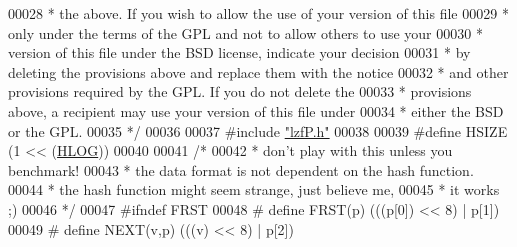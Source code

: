 \begin{DoxyCode}
00028 \textcolor{comment}{ * the above. If you wish to allow the use of your version of this file}
00029 \textcolor{comment}{ * only under the terms of the GPL and not to allow others to use your}
00030 \textcolor{comment}{ * version of this file under the BSD license, indicate your decision}
00031 \textcolor{comment}{ * by deleting the provisions above and replace them with the notice}
00032 \textcolor{comment}{ * and other provisions required by the GPL. If you do not delete the}
00033 \textcolor{comment}{ * provisions above, a recipient may use your version of this file under}
00034 \textcolor{comment}{ * either the BSD or the GPL.}
00035 \textcolor{comment}{ */}
00036 
00037 \textcolor{preprocessor}{#}\textcolor{preprocessor}{include} \hyperlink{lzfP_8h}{"lzfP.h"}
00038 
00039 \textcolor{preprocessor}{#}\textcolor{preprocessor}{define} \textcolor{preprocessor}{HSIZE} \textcolor{preprocessor}{(}1 \textcolor{preprocessor}{<<} \textcolor{preprocessor}{(}\hyperlink{lzfP_8h_aaa67275c53290bd99d516d4b9a5d7d76}{HLOG}\textcolor{preprocessor}{)}\textcolor{preprocessor}{)}
00040 
00041 \textcolor{comment}{/*}
00042 \textcolor{comment}{ * don't play with this unless you benchmark!}
00043 \textcolor{comment}{ * the data format is not dependent on the hash function.}
00044 \textcolor{comment}{ * the hash function might seem strange, just believe me,}
00045 \textcolor{comment}{ * it works ;)}
00046 \textcolor{comment}{ */}
00047 \textcolor{preprocessor}{#}\textcolor{preprocessor}{ifndef} \textcolor{preprocessor}{FRST}
00048 \textcolor{preprocessor}{#} \textcolor{preprocessor}{define} \textcolor{preprocessor}{FRST}\textcolor{preprocessor}{(}\textcolor{preprocessor}{p}\textcolor{preprocessor}{)} \textcolor{preprocessor}{(}\textcolor{preprocessor}{(}\textcolor{preprocessor}{(}\textcolor{preprocessor}{p}\textcolor{preprocessor}{[}0\textcolor{preprocessor}{]}\textcolor{preprocessor}{)} \textcolor{preprocessor}{<<} 8\textcolor{preprocessor}{)} \textcolor{preprocessor}{|} \textcolor{preprocessor}{p}\textcolor{preprocessor}{[}1\textcolor{preprocessor}{]}\textcolor{preprocessor}{)}
00049 \textcolor{preprocessor}{#} \textcolor{preprocessor}{define} \textcolor{preprocessor}{NEXT}\textcolor{preprocessor}{(}\textcolor{preprocessor}{v}\textcolor{preprocessor}{,}\textcolor{preprocessor}{p}\textcolor{preprocessor}{)} \textcolor{preprocessor}{(}\textcolor{preprocessor}{(}\textcolor{preprocessor}{(}\textcolor{preprocessor}{v}\textcolor{preprocessor}{)} \textcolor{preprocessor}{<<} 8\textcolor{preprocessor}{)} \textcolor{preprocessor}{|} \textcolor{preprocessor}{p}\textcolor{preprocessor}{[}2\textcolor{preprocessor}{]}\textcolor{preprocessor}{)}

\end{DoxyCode}
